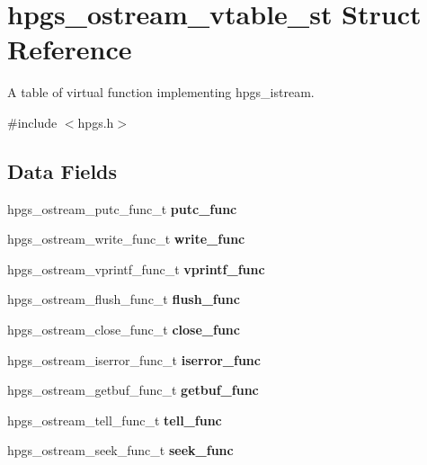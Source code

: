 \section{hpgs\_\-ostream\_\-vtable\_\-st Struct Reference}
\label{structhpgs__ostream__vtable__st}


A table of virtual function implementing {\ttfamily hpgs\_\-istream}.  




{\ttfamily \#include $<$hpgs.h$>$}

\subsection*{Data Fields}
\begin{DoxyCompactItemize}
\item 
hpgs\_\-ostream\_\-putc\_\-func\_\-t {\bfseries putc\_\-func}\label{structhpgs__ostream__vtable__st_aeaf403b461098c878dfa9334fc922cb6}

\item 
hpgs\_\-ostream\_\-write\_\-func\_\-t {\bfseries write\_\-func}\label{structhpgs__ostream__vtable__st_a0916e7d7f9a0e71a14b1733dbe7cc939}

\item 
hpgs\_\-ostream\_\-vprintf\_\-func\_\-t {\bfseries vprintf\_\-func}\label{structhpgs__ostream__vtable__st_a1548b738591c3900411c9799909aba39}

\item 
hpgs\_\-ostream\_\-flush\_\-func\_\-t {\bfseries flush\_\-func}\label{structhpgs__ostream__vtable__st_aa73c787fec63247c4b874e763f31631a}

\item 
hpgs\_\-ostream\_\-close\_\-func\_\-t {\bfseries close\_\-func}\label{structhpgs__ostream__vtable__st_a9ef986cdd5e80b125f998c8406668c51}

\item 
hpgs\_\-ostream\_\-iserror\_\-func\_\-t {\bfseries iserror\_\-func}\label{structhpgs__ostream__vtable__st_accb6a2fa7f0fab5b533660dd7a4aa38c}

\item 
hpgs\_\-ostream\_\-getbuf\_\-func\_\-t {\bfseries getbuf\_\-func}\label{structhpgs__ostream__vtable__st_a598a6306d72364061a0a6044315d5cfd}

\item 
hpgs\_\-ostream\_\-tell\_\-func\_\-t {\bfseries tell\_\-func}\label{structhpgs__ostream__vtable__st_a7f897c6353067b6d12885b8cf1dc6fb7}

\item 
hpgs\_\-ostream\_\-seek\_\-func\_\-t {\bfseries seek\_\-func}\label{structhpgs__ostream__vtable__st_a6534baa459ab889a28392fe32648b48f}

\end{DoxyCompactItemize}


